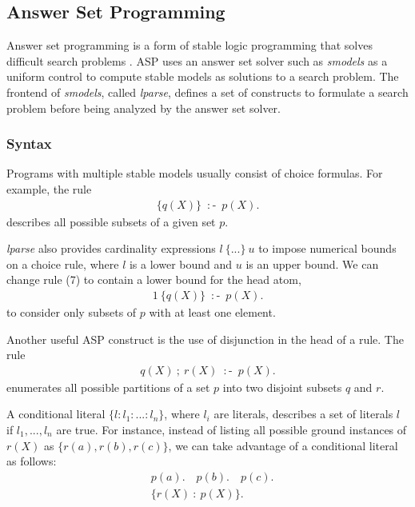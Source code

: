 \subsection{Answer Set Programming}
Answer set programming is a form of stable logic programming that solves difficult 
search problems \cite{ferraris}. ASP uses an answer set solver such as \textit{smodels} as a uniform control 
to compute stable models as solutions to a search problem. The frontend of \textit{smodels}, 
called \textit{lparse}, defines a set of constructs to formulate a search problem before 
being analyzed by the answer set solver. 

\subsubsection{Syntax}
Programs 
with multiple stable models usually consist of choice formulas. For example, the rule 
\begin{align}
    \{q(X)\} \: \mathop{:\!\!-} \: p(X).
\end{align}
describes all possible subsets of a given set $p$. 

\textit{lparse} also provides cardinality expressions $l \: \{...\} \: u$ to impose numerical 
bounds on a choice rule, where $l$ is a lower bound and $u$ is an upper bound. We can change 
rule (7) to contain a lower bound for the head atom, 
\begin{align*}
    1 \: \{q(X)\} \: \mathop{:\!\!-} \: p(X).
\end{align*}
to consider only subsets of $p$ with at least one element. 

Another useful ASP construct is the use of disjunction in the head of a rule. The 
rule 
\begin{align*}
    q(X) \: ; \: r(X) \: \mathop{:\!\!-} \: p(X).
\end{align*}
enumerates all possible partitions of a set $p$ into two disjoint subsets $q$ and $r$. 

A conditional literal $\{l:l_1:...:l_n\}$, where $l_i$ are literals, describes a set of 
literals $l$ if $l_1,...,l_n$ are true. For instance, instead of listing all possible 
ground instances of $r(X)$ as $\{r(a),r(b),r(c)\}$, we can take advantage of a conditional 
literal as follows:
\begin{align*}
    &p(a). \hspace{1em} p(b). \hspace{1em} p(c). \\
    &\{r(X) \: : \: p(X)\}.
\end{align*}


